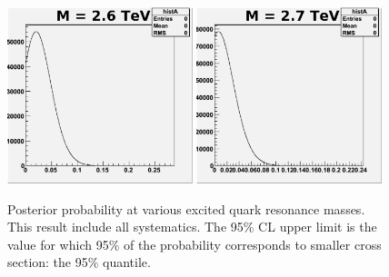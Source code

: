 \begin{figure}[!ht]
\begin{center}
     \includegraphics[width=0.48\textwidth]{Figures/MCpost2600_6_pe0.pdf}
     \includegraphics[width=0.48\textwidth]{Figures/MCpost2700_6_pe0.pdf}
 \caption{Posterior probability at
 various excited quark resonance masses.  This result include all systematics.
 The 95\% CL upper limit is the value for which 95\% of
 the probability corresponds to smaller cross section: the 95\% quantile.}
    \label{likeli3}
  \end{center}
\end{figure}

\clearpage

